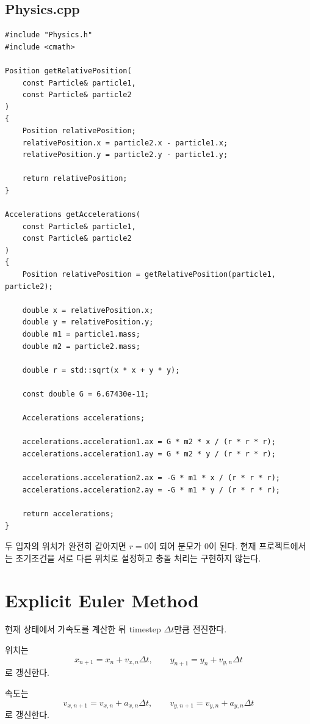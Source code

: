 \documentclass[11pt,a4paper]{article}
\begin{document}
\subsection{Physics.cpp}
\begin{lstlisting}
#include "Physics.h"
#include <cmath>

Position getRelativePosition(
    const Particle& particle1,
    const Particle& particle2
)
{
    Position relativePosition;
    relativePosition.x = particle2.x - particle1.x;
    relativePosition.y = particle2.y - particle1.y;

    return relativePosition;
}

Accelerations getAccelerations(
    const Particle& particle1,
    const Particle& particle2
)
{
    Position relativePosition = getRelativePosition(particle1, particle2);

    double x = relativePosition.x;
    double y = relativePosition.y;
    double m1 = particle1.mass;
    double m2 = particle2.mass;

    double r = std::sqrt(x * x + y * y);

    const double G = 6.67430e-11;

    Accelerations accelerations;

    accelerations.acceleration1.ax = G * m2 * x / (r * r * r);
    accelerations.acceleration1.ay = G * m2 * y / (r * r * r);

    accelerations.acceleration2.ax = -G * m1 * x / (r * r * r);
    accelerations.acceleration2.ay = -G * m1 * y / (r * r * r);

    return accelerations;
}
\end{lstlisting}

\begin{importantbox}
두 입자의 위치가 완전히 같아지면 $r=0$이 되어 분모가 0이 된다. 현재 프로젝트에서는 초기조건을 서로 다른 위치로 설정하고 충돌 처리는 구현하지 않는다.
\end{importantbox}

\section{Explicit Euler Method}
현재 상태에서 가속도를 계산한 뒤 timestep $\Delta t$만큼 전진한다.

위치는
\[
x_{n+1}=x_n+v_{x,n}\Delta t,
\qquad
y_{n+1}=y_n+v_{y,n}\Delta t
\]
로 갱신한다.

속도는
\[
v_{x,n+1}=v_{x,n}+a_{x,n}\Delta t,
\qquad
v_{y,n+1}=v_{y,n}+a_{y,n}\Delta t
\]
로 갱신한다.
\end{document}
